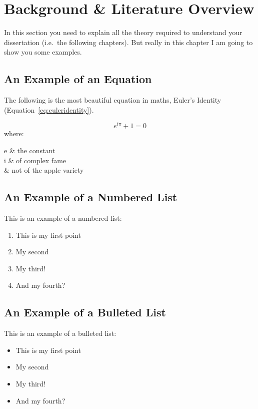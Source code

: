 \chapter{Background \& Literature Overview}

In this section you need to explain all the theory required to understand your dissertation (i.e.\ the following chapters). But really in this chapter I am going to show you some examples.

\section{An Example of an Equation}

The following is the most beautiful equation in maths, Euler's Identity (Equation~\ref{eq:euleridentity}).

\begin{equation}\label{eq:euleridentity}
	e^{i\pi}+1=0
\end{equation}
where:
\begin{conditionsenv*}
	e 		& the constant \\
	i 		& of complex fame \\
	\pi		& not of the apple variety \\
\end{conditionsenv*}

\blindtext[2]

\section{An Example of a Numbered List}

This is an example of a numbered list:

\begin{enumerate}
	\item This is my first point
	\item My second
	\item My third!
	\item And my fourth?
\end{enumerate}

\blindtext

\section{An Example of a Bulleted List}

This is an example of a bulleted list:

\begin{itemize}
	\item This is my first point
	\item My second
	\item My third!
	\item And my fourth?
\end{itemize}

